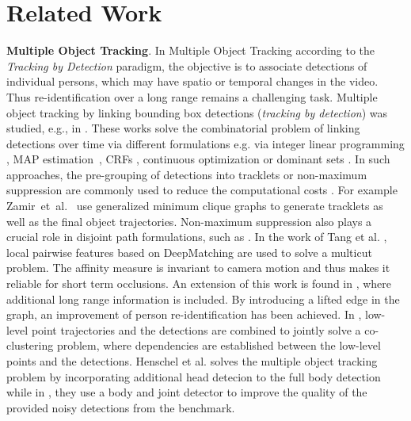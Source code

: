 
\section{Related Work}
\label{sec:related}
\noindent\textbf{Multiple Object Tracking}. 
In Multiple Object Tracking according to the \textit{Tracking by Detection} paradigm, the objective is to associate detections of individual persons, which may have spatio or temporal changes in the video. 
Thus re-identification over a long range remains a challenging task.
Multiple object tracking by linking bounding box detections (\emph{tracking by detection}) was studied, e.g., in \cite{Pirsiavash:2011:GOG,Andriyenko2012CVPR,Huang:2008:ROT,AndrilukaCVPR2010,FragkiadakiECCV12,Zamir:2012:GMC,Henschel:2014:EMP,tang14ijcv,Henschel:2014:EMP,DBLP:journals/corr/HenschelLCR17}. 
These works solve the combinatorial problem of linking detections over time via different formulations e.g. via integer linear programming \cite{Shitrit:2011:TMP,wang-et-al-2014}, MAP estimation~\cite{Pirsiavash:2011:GOG}, CRFs \cite{10.1007/978-3-319-16817-3_29}, continuous optimization \cite{Andriyenko2012CVPR} or dominant sets \cite{7503631}. 
In such approaches, the pre-grouping of detections into tracklets or non-maximum suppression are commonly used to reduce the computational costs \cite{Huang:2008:ROT,WojekECCV10,AndrilukaCVPR2010,FragkiadakiECCV12,Zamir:2012:GMC,WojekPAMI2013,Henschel:2014:EMP,tang14ijcv}.
For example Zamir~et~al.~\cite{Zamir:2012:GMC} use generalized minimum clique graphs to generate tracklets as well as the final object trajectories.
Non-maximum suppression also plays a crucial role in disjoint path formulations, such as \cite{networkflow1,networkflow2,Chari2015OnPC}.
In the work of Tang et al. \cite{tang2016multi}, local pairwise features based on DeepMatching are used to solve a multicut problem. 
The affinity measure is invariant to camera motion and thus makes it reliable for short term occlusions. 
An extension of this work is found in \cite{tang2017multiple}, where additional long range information is included. 
By introducing a lifted edge in the graph, an improvement of person re-identification has been achieved.
In \cite{keuper2018motion}, low-level point trajectories and the detections are combined to jointly solve a co-clustering problem, where dependencies are established between the low-level points and the detections. 
Henschel et al. \cite{henschel2018fusion} solves the multiple object tracking problem by incorporating additional head detecion to the full body detection while in \cite{henschel2019multiple}, they use a body and joint detector to improve the quality of the provided noisy detections from the benchmark.
